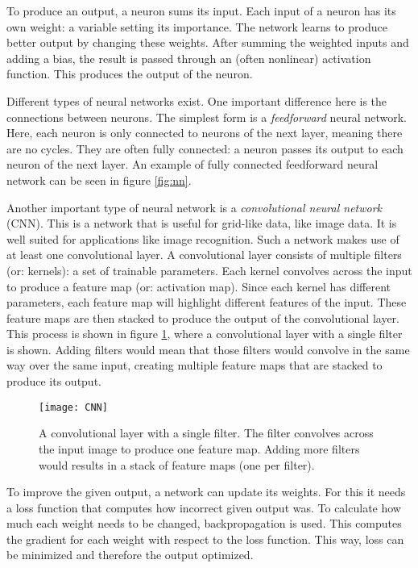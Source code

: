 To produce an output, a neuron sums its input. Each input of a neuron has its own weight: a variable setting its importance. The network learns to produce better output by changing these weights. After summing the weighted inputs and adding a bias, the result is passed through an (often nonlinear) activation function. This produces the output of the neuron. 

Different types of neural networks exist. One important difference here is the connections between neurons. The simplest form is a \emph{feedforward} neural network. Here, each neuron is only connected to neurons of the next layer, meaning there are no cycles. They are often fully connected: a neuron passes its output to each neuron of the next layer. An example of fully connected feedforward neural network can be seen in figure \ref{fig:nn}.

Another important type of neural network is a \emph{convolutional neural network} (CNN). This is a network that is useful for grid-like data, like image data. It is well suited for applications like image recognition. Such a network makes use of at least one convolutional layer. A convolutional layer consists of multiple filters (or: kernels): a set of trainable parameters. Each kernel convolves across the input to produce a feature map (or: activation map). Since each kernel has different parameters, each feature map will highlight different features of the input. These feature maps are then stacked to produce the output of the convolutional layer. This process is shown in figure \ref{fig:cnn}, where a convolutional layer with a single filter is shown. Adding filters would mean that those filters would convolve in the same way over the same input, creating multiple feature maps that are stacked to produce its output.

\begin{figure}[h]
    \centering
    \texttt{[image: CNN]}
    \caption{A convolutional layer with a single filter. The filter convolves across the input image to produce one feature map. Adding more filters would results in a stack of feature maps (one per filter).}
    \label{fig:cnn}
\end{figure}

To improve the given output, a network can update its weights. For this it needs a loss function that computes how incorrect given output was. To calculate how much each weight needs to be changed, backpropagation is used. This computes the gradient for each weight with respect to the loss function. This way, loss can be minimized and therefore the output optimized.


